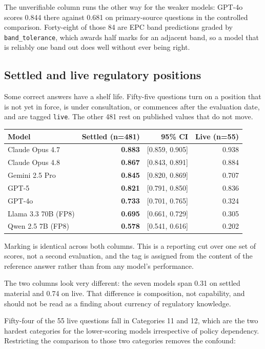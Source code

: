 \documentclass[11pt,a4paper]{article}
\begin{document}
The unverifiable column runs the other way for the weaker models: GPT-4o scores 0.844 there against 0.681 on primary-source questions in the controlled comparison. Forty-eight of those 84 are EPC band predictions graded by \texttt{band\_tolerance}, which awards half marks for an adjacent band, so a model that is reliably one band out does well without ever being right.

\subsection{Settled and live regulatory positions}

Some correct answers have a shelf life. Fifty-five questions turn on a position that is not yet in force, is under consultation, or commences after the evaluation date, and are tagged \texttt{live}. The other 481 rest on published values that do not move.

\begin{center}
\begin{tabular}{lrrr}
\toprule
Model & Settled (n=481) & 95\% CI & Live (n=55) \\
\midrule
Claude Opus 4.7 & \textbf{0.883} & [0.859, 0.905] & 0.938 \\
Claude Opus 4.8 & \textbf{0.867} & [0.843, 0.891] & 0.884 \\
Gemini 2.5 Pro & \textbf{0.845} & [0.820, 0.869] & 0.707 \\
GPT-5 & \textbf{0.821} & [0.791, 0.850] & 0.836 \\
GPT-4o & \textbf{0.733} & [0.701, 0.765] & 0.324 \\
Llama 3.3 70B (FP8) & \textbf{0.695} & [0.661, 0.729] & 0.305 \\
Qwen 2.5 7B (FP8) & \textbf{0.578} & [0.541, 0.616] & 0.202 \\
\bottomrule
\end{tabular}
\end{center}

Marking is identical across both columns. This is a reporting cut over one set of scores, not a second evaluation, and the tag is assigned from the content of the reference answer rather than from any model's performance.

The two columns look very different: the seven models span 0.31 on settled material and 0.74 on live. That difference is composition, not capability, and should not be read as a finding about currency of regulatory knowledge.

Fifty-four of the 55 live questions fall in Categories 11 and 12, which are the two hardest categories for the lower-scoring models irrespective of policy dependency. Restricting the comparison to those two categories removes the confound:
\end{document}
